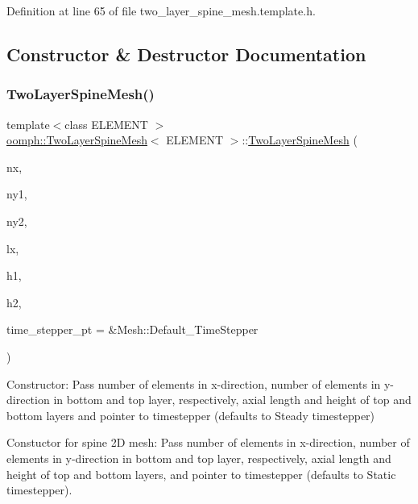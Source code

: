 Definition at line 65 of file two\+\_\+layer\+\_\+spine\+\_\+mesh.\+template.\+h.



\subsection{Constructor \& Destructor Documentation}
\mbox{\label{classoomph_1_1TwoLayerSpineMesh_a0c41a93e9ccaaa34956215e64611be2a}} 
\subsubsection{\texorpdfstring{Two\+Layer\+Spine\+Mesh()}{TwoLayerSpineMesh()}\hspace{0.1cm}{\footnotesize\ttfamily [1/3]}}
{\footnotesize\ttfamily template$<$class E\+L\+E\+M\+E\+NT $>$ \\
\hyperlink{classoomph_1_1TwoLayerSpineMesh}{oomph\+::\+Two\+Layer\+Spine\+Mesh}$<$ E\+L\+E\+M\+E\+NT $>$\+::\hyperlink{classoomph_1_1TwoLayerSpineMesh}{Two\+Layer\+Spine\+Mesh} (\begin{DoxyParamCaption}\item[{const unsigned \&}]{nx,  }\item[{const unsigned \&}]{ny1,  }\item[{const unsigned \&}]{ny2,  }\item[{const double \&}]{lx,  }\item[{const double \&}]{h1,  }\item[{const double \&}]{h2,  }\item[{Time\+Stepper $\ast$}]{time\+\_\+stepper\+\_\+pt = {\ttfamily \&Mesh\+:\+:Default\+\_\+TimeStepper} }\end{DoxyParamCaption})}



Constructor\+: Pass number of elements in x-\/direction, number of elements in y-\/direction in bottom and top layer, respectively, axial length and height of top and bottom layers and pointer to timestepper (defaults to Steady timestepper) 

Constuctor for spine 2D mesh\+: Pass number of elements in x-\/direction, number of elements in y-\/direction in bottom and top layer, respectively, axial length and height of top and bottom layers, and pointer to timestepper (defaults to Static timestepper).

